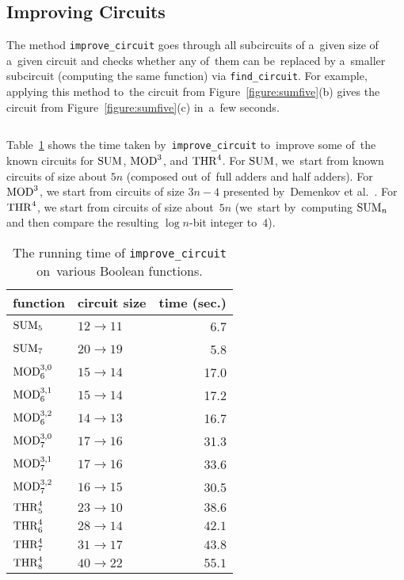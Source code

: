\subsection{Improving Circuits}
The method \texttt{improve_circuit}
goes through all subcircuits of a~given size
of a~given circuit and checks whether any
of~them can be~replaced by a~smaller subcircuit
(computing the same function) via \texttt{find_circuit}. For example, applying this method
to~the circuit from Figure~\ref{figure:sumfive}(b)
gives the circuit from Figure~\ref{figure:sumfive}(c)
in~a~few seconds.
%
\inputminted[firstline=62,lastline=67]{python}{../tutorial.py}
Table~\ref{table:improvementrunningtimes} shows the time
taken by~\texttt{improve\_circuit} to~improve some
of~the known circuits for $\operatorname{SUM}$, $\operatorname{MOD}^3$, and $\operatorname{THR}^4$.
For $\operatorname{SUM}$, we~start from known circuits of size about $5n$
(composed out of~full adders and half adders). For $\operatorname{MOD}^3$,
we start from circuits of size $3n-4$ presented by~Demenkov et al.~\cite{DBLP:journals/ipl/DemenkovKKY10}. For $\operatorname{THR}^4$, we start from circuits of
size about~$5n$ (we~start by~computing $\operatorname{SUM}_n$ and then compare the
resulting $\log n$-bit integer to~$4$).

\begin{table}[!ht]
\begin{center}
\begin{tabular}{llr}
\toprule
function & circuit size & time (sec.)\\
\midrule
$\operatorname{SUM}_5$ & $12 \to 11$ & 6.7\\
$\operatorname{SUM}_7$ & $20 \to 19$ & 5.8\\
\midrule
$\operatorname{MOD}_6^{3,0}$ & $15 \to 14$ & 17.0\\
$\operatorname{MOD}_6^{3,1}$ & $15 \to 14$ & 17.2\\
$\operatorname{MOD}_6^{3,2}$ & $14 \to 13$ & 16.7\\
$\operatorname{MOD}_7^{3,0}$ & $17 \to 16$ & 31.3\\
$\operatorname{MOD}_7^{3,1}$ & $17 \to 16$ & 33.6\\
$\operatorname{MOD}_7^{3,2}$ & $16 \to 15$ & 30.5\\
\midrule
$\operatorname{THR}^4_5$ & $23 \to 10$ & $38.6$\\
$\operatorname{THR}^4_6$ & $28 \to 14$ & $42.1$\\
$\operatorname{THR}^4_7$ & $31 \to 17$ & $43.8$\\
$\operatorname{THR}^4_8$ & $40 \to 22$ & $55.1$\\
\bottomrule
\end{tabular}
\end{center}
\caption{The running time of \texttt{improve\_circuit} on~various Boolean functions.} \label{table:improvementrunningtimes}
\end{table}

